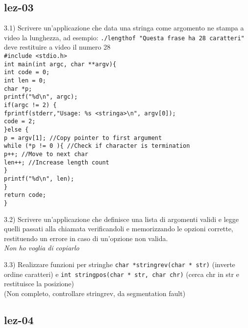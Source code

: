 \subsection{lez-03}
\begin{flushleft}
3.1) Scrivere un'applicazione che data una stringa come argomento ne stampa a video la 
lunghezza, ad esempio:
\texttt{./lengthof "Questa frase ha 28 caratteri"}\\
deve restituire a video il numero 28 \\ 
\texttt{\#include <stdio.h>\\
int main(int argc, char **argv)\{ \\
  \tab int code = 0; \\
  \tab int len = 0; \\
  \tab char *p; \\
  \tab printf("\%d\textbackslash n", argc); \\
  \tab if(argc != 2) \{ \\
    \tab \tab fprintf(stderr,"Usage: \%s <stringa>\textbackslash n", argv[0]); \\
    \tab \tab code = 2; \\
  \tab \}else \{ \\
    \tab \tab p = argv[1]; //Copy pointer to first argument \\
    \tab \tab while (*p != 0 )\{  //Check if character is termination\\
      \tab \tab \tab p++; //Move to next char \\
      \tab \tab \tab len++; //Increase length count \\
    \tab \tab \} \\
    \tab \tab printf("\%d\textbackslash n", len); \\
  \tab \} \\
  \tab return code; \\
\}
}
\end{flushleft}

\begin{flushleft}
  3.2) Scrivere un'applicazione che definisce una lista di argomenti validi e legge quelli passati 
  alla chiamata verificandoli e memorizzando le opzioni corrette, restituendo un errore in 
  caso di un'opzione non valida. \\
  \textit{Non ho voglia di copiarlo}
\end{flushleft}

\begin{flushleft}
  3.3) Realizzare funzioni per stringhe \texttt{char *stringrev(char * str)} (inverte ordine 
caratteri) e \texttt{int stringpos(char * str, char chr)} (cerca chr in str e restituisce la 
posizione) \\
(Non completo, controllare stringrev, da segmentation fault)
\end{flushleft}

\subsection{lez-04}